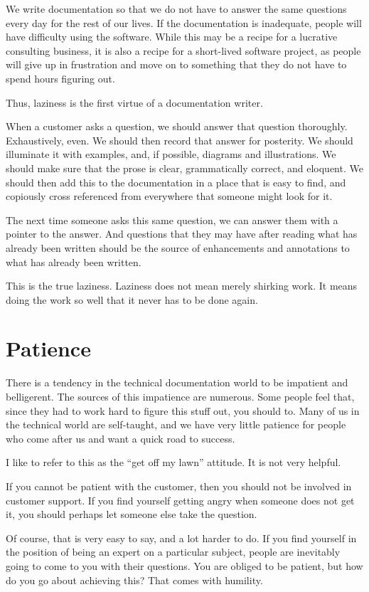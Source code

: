 We write documentation so that we do not have to answer the same questions every
day for the rest of our lives. If the documentation is inadequate, people will
have difficulty using the software. While this may be a recipe for a lucrative
consulting business, it is also a recipe for a short-lived software project, as
people will give up in frustration and move on to something that they do not
have to spend hours figuring out.

Thus, laziness is the first virtue of a documentation writer.

When a customer asks a question, we should answer that question thoroughly.
Exhaustively, even. We should then record that answer for posterity. We should
illuminate it with examples, and, if possible, diagrams and illustrations. We
should make sure that the prose is clear, grammatically correct, and eloquent.
We should then add this to the documentation in a place that is easy to find,
and copiously cross referenced from everywhere that someone might look for it.

The next time someone asks this same question, we can answer them with a pointer
to the answer. And questions that they may have after reading what has already
been written should be the source of enhancements and annotations to what has
already been written.

This is the true laziness. Laziness does not mean merely shirking work. It means
doing the work so well that it never has to be done again.

\section*{Patience}
There is a tendency in the technical documentation world to be impatient and
belligerent. The sources of this impatience are numerous. Some people feel that,
since they had to work hard to figure this stuff out, you should to. Many of us
in the technical world are self-taught, and we have very little patience for
people who come after us and want a quick road to success.

I like to refer to this as the ``get off my lawn'' attitude. It is not very
helpful.

If you cannot be patient with the customer, then you should not be involved in
customer support. If you find yourself getting angry when someone does not get
it, you should perhaps let someone else take the question.

Of course, that is very easy to say, and a lot harder to do. If you find
yourself in the position of being an expert on a particular subject, people are
inevitably going to come to you with their questions.
You are obliged to be patient, but how do you go about achieving this? That
comes with humility.

